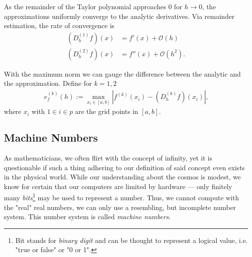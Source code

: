 As the remainder of the Taylor polynomial approaches \(0\) for \(h \rightarrow 0\), the approximations uniformly converge to the analytic derivatives. Via remainder estimation, the rate of convergence is
\begin{align*}
    (D^{(1)}_h f) (x) &= f'(x) + \mathcal{O}(h) \\
    (D^{(2)}_h f) (x) &= f''(x) + \mathcal{O}(h^2) \text{.}
\end{align*}

\noindent With the maximum norm we can gauge the difference between the analytic and the approximation. Define for \(k = 1, 2\)
\begin{align*}
    e^{(k)}_f (h) := \max_{x_i \in [a, b]} \left| f^{(k)} (x_i) - (D^{(k)}_h f) (x_i)\right| \text{,}
\end{align*}
where \(x_i\) with \(1 \in i \in p\) are the grid points in \([a, b]\).

\subsection{Machine Numbers \cite{EWR}}\label{cha:machine}

As mathematicians, we often flirt with the concept of infinity, yet it is questionable if such a thing adhering to our definition of said concept even exists in the physical world. While our understanding about the cosmos is modest, we know for certain that our computers are limited by hardware --- only finitely many \textit{bits}\footnote{Bit stands for \textit{binary digit} and can be thought to represent a logical value, i.e. "true or false" or "0 or 1".} may be used to represent a number. Thus, we cannot compute with the "real" real numbers, we can only use a resembling, but incomplete number system. This number system is called \textit{machine numbers}.

